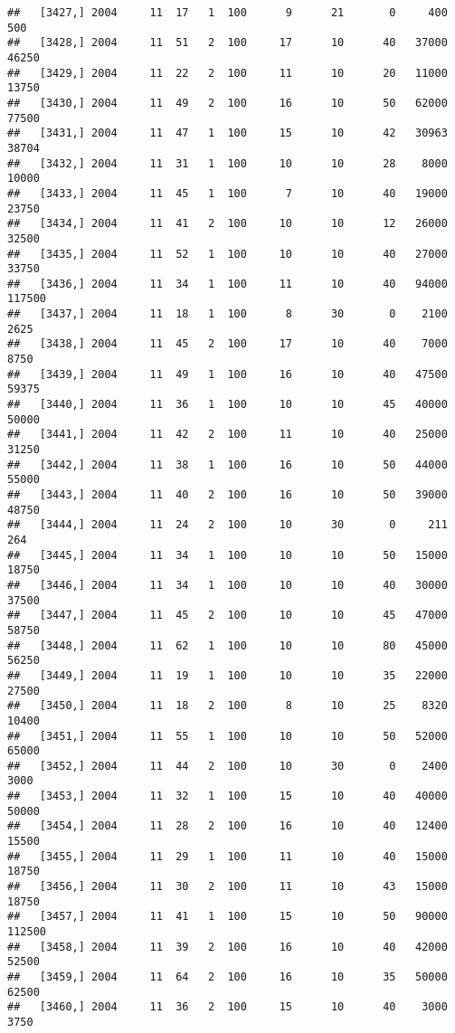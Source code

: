 \documentclass{article}\usepackage[]{graphicx}\usepackage[]{color}
\makeatletter
\newenvironment{kframe}{%
 \def\at@end@of@kframe{}%
 \ifinner\ifhmode%
  \def\at@end@of@kframe{\end{minipage}}%
  \begin{minipage}{\columnwidth}%
 \fi\fi%
 \def\FrameCommand##1{\hskip\@totalleftmargin \hskip-\fboxsep
 \colorbox{shadecolor}{##1}\hskip-\fboxsep
     \hskip-\linewidth \hskip-\@totalleftmargin \hskip\columnwidth}%
 \MakeFramed {\advance\hsize-\width
   \@totalleftmargin\z@ \linewidth\hsize
   \@setminipage}}%
 {\par\unskip\endMakeFramed%
 \at@end@of@kframe}
\newenvironment{knitrout}{}{} %
\makeatother
\begin{document}
\begin{knitrout}
\begin{kframe}
\begin{verbatim}
##   [3427,] 2004     11  17   1  100      9      21       0     400     500
##   [3428,] 2004     11  51   2  100     17      10      40   37000   46250
##   [3429,] 2004     11  22   2  100     11      10      20   11000   13750
##   [3430,] 2004     11  49   2  100     16      10      50   62000   77500
##   [3431,] 2004     11  47   1  100     15      10      42   30963   38704
##   [3432,] 2004     11  31   1  100     10      10      28    8000   10000
##   [3433,] 2004     11  45   1  100      7      10      40   19000   23750
##   [3434,] 2004     11  41   2  100     10      10      12   26000   32500
##   [3435,] 2004     11  52   1  100     10      10      40   27000   33750
##   [3436,] 2004     11  34   1  100     11      10      40   94000  117500
##   [3437,] 2004     11  18   1  100      8      30       0    2100    2625
##   [3438,] 2004     11  45   2  100     17      10      40    7000    8750
##   [3439,] 2004     11  49   1  100     16      10      40   47500   59375
##   [3440,] 2004     11  36   1  100     10      10      45   40000   50000
##   [3441,] 2004     11  42   2  100     11      10      40   25000   31250
##   [3442,] 2004     11  38   1  100     16      10      50   44000   55000
##   [3443,] 2004     11  40   2  100     16      10      50   39000   48750
##   [3444,] 2004     11  24   2  100     10      30       0     211     264
##   [3445,] 2004     11  34   1  100     10      10      50   15000   18750
##   [3446,] 2004     11  34   1  100     10      10      40   30000   37500
##   [3447,] 2004     11  45   2  100     10      10      45   47000   58750
##   [3448,] 2004     11  62   1  100     10      10      80   45000   56250
##   [3449,] 2004     11  19   1  100     10      10      35   22000   27500
##   [3450,] 2004     11  18   2  100      8      10      25    8320   10400
##   [3451,] 2004     11  55   1  100     10      10      50   52000   65000
##   [3452,] 2004     11  44   2  100     10      30       0    2400    3000
##   [3453,] 2004     11  32   1  100     15      10      40   40000   50000
##   [3454,] 2004     11  28   2  100     16      10      40   12400   15500
##   [3455,] 2004     11  29   1  100     11      10      40   15000   18750
##   [3456,] 2004     11  30   2  100     11      10      43   15000   18750
##   [3457,] 2004     11  41   1  100     15      10      50   90000  112500
##   [3458,] 2004     11  39   2  100     16      10      40   42000   52500
##   [3459,] 2004     11  64   2  100     16      10      35   50000   62500
##   [3460,] 2004     11  36   2  100     15      10      40    3000    3750

\end{verbatim}
\end{kframe}
\end{knitrout}
\end{document}
